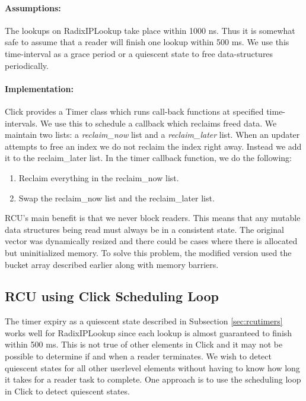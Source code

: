 \documentclass[12pt,a4paper]{article}
\begin{document}
\paragraph{Assumptions:}
The lookups on RadixIPLookup take place within 1000 ns. Thus it is somewhat safe to assume that a reader will finish one lookup within 500 ms.
We use this time-interval as a grace period or a quiescent state to free data-structures periodically.
\paragraph{Implementation:}
Click provides a Timer class which runs call-back functions at specified time-intervals. We use this to schedule a callback which reclaims freed data.
We maintain two lists: a \emph{reclaim\_now} list and a \emph{reclaim\_later} list. When an updater attempts to free an index we do not reclaim the index right away. Instead we add it to the reclaim\_later list.
In the timer callback function, we do the following:
\begin{enumerate}
\item Reclaim everything in the reclaim\_now list.
\item Swap the reclaim\_now list and the reclaim\_later list.
\end{enumerate}

RCU's main benefit is that we never block readers. This means that any mutable data structures being read must always be in a consistent state. The original vector was dynamically resized and there could be cases where there is allocated but uninitialized memory. To solve this problem, the modified version used the bucket array described earlier along with memory barriers. 
\subsection{RCU using Click Scheduling Loop}
\label{rcuschedloop}
The timer expiry as a quiescent state described in Subsection \ref{sec:rcutimers} works well for RadixIPLookup since each lookup is almost guaranteed to finish within 500 ms. This is not true of other elements in Click and it may not be possible to determine if and when a reader terminates. We wish to detect quiescent states for all other userlevel elements without having to know how long it takes for a reader task to complete. One approach is to use the scheduling loop in Click to detect quiescent states.
\end{document}
